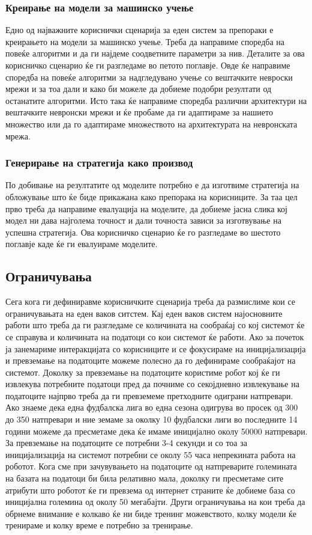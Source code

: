 \subsubsection{Креирање на модели за машинско учење}
Едно од најважните кориснички сценарија за еден систем за препораки е креирањето на модели за машинско учење. Треба да направиме споредба на повеќе алгоритми и да ги најдеме соодветните параметри за нив. Деталите за ова корисничко сценарио ќе ги разгледаме во петото поглавје. Овде ќе направиме споредба на повеќе алгоритми за надгледувано учење со вештачките невроски мрежи и за тоа дали и како би можеле да добиеме подобри резултати од останатите алгоритми. Исто така ќе направиме споредба различни архитектури на вештачките невронски мрежи и ќе пробаме да ги адаптираме за нашието множество или да го адаптираме множеството на архитектурата на невронската мрежа.
\subsubsection{Генерирање на стратегија како производ}
По добивање на резултатите од моделите потребно е да изготвиме стратегија на обложување што ќе биде прикажана како препорака на корисниците. За таа цел прво треба да направиме евалуација на моделите, да добиеме јасна слика кој модел ни дава најголема точност и дали точноста зависи за изготвување на успешна стратегија. Ова корисничко сценарио ќе го разгледаме во шестото поглавје каде ќе ги евалуираме моделите.
\subsection{Ограничувања}
Сега кога ги дефиниравме корисничките сценарија треба да размислиме кои се ограничувањата на еден ваков ситстем. Кај еден ваков систем најосновните работи што треба да ги разгледаме се количината на сообраќај со кој системот ќе се справува и количината на податоци со кои системот ќе работи. Ако за почеток ја занемариме интеракцијата со корисниците и се фокусираме на иницијализација и превземање на податоците можеме полесно да го дефинираме сообраќајот на системот. Доколку за превземање на податоците користиме робот кој ќе ги извлекува потребните податоци пред да почниме со секојдневно извлекување на податоците најпрво треба да ги превземеме претходните одиграни натпревари. Ако знаеме дека една фудбалска лига во една сезона одигрува во просек од 300 до 350 натпревари и ние земаме за околку 10 фудбалски лиги во последните 14 години можеме да пресметаме дека ќе имаме иницијално околу 50000 натпревари. За превземање на податоците се потребни 3-4 секунди и со тоа за иницијализација на системот потребни се околу 55 часа непрекината работа на роботот. Кога сме при зачувувањето на податоците од натпреварите големината на базата на податоци би била релативно мала, доколку ги пресметаме сите атрибути што роботот ќе ги превзема од интернет страните ќе добиеме база со иницијална големина од околу 50 мегабајти. Други ограничувања на кои треба да обрнеме внимание е колкаво ќе ни биде тренинг можевството, колку модели ќе тренираме и колку време е потребно за тренирање. 
